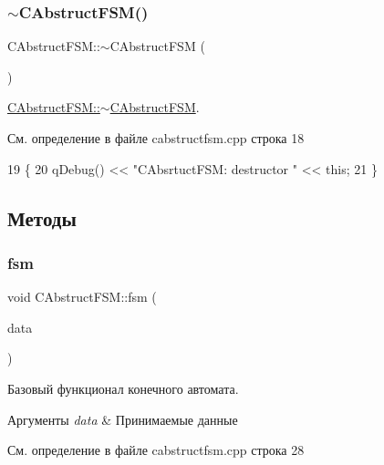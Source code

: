 \subsubsection{\texorpdfstring{$\sim$\+C\+Abstruct\+F\+S\+M()}{~CAbstructFSM()}}
{\footnotesize\ttfamily C\+Abstruct\+F\+S\+M\+::$\sim$\+C\+Abstruct\+F\+SM (\begin{DoxyParamCaption}{ }\end{DoxyParamCaption})\hspace{0.3cm}{\ttfamily [virtual]}}



\hyperlink{class_c_abstruct_f_s_m_acef4a425dee5b9705bc6bbff79225bae}{C\+Abstruct\+F\+S\+M\+::$\sim$\+C\+Abstruct\+F\+SM}. 



См. определение в файле cabstructfsm.\+cpp строка 18


\begin{DoxyCode}
19 \{
20     qDebug() << \textcolor{stringliteral}{"CAbsrtuctFSM: destructor "} << \textcolor{keyword}{this};
21 \}
\end{DoxyCode}


\subsection{Методы}
\hypertarget{class_c_abstruct_f_s_m_ae06497e1f93385cd6c20eaa84fc253c1}{}\label{class_c_abstruct_f_s_m_ae06497e1f93385cd6c20eaa84fc253c1} 
\subsubsection{\texorpdfstring{fsm}{fsm}}
{\footnotesize\ttfamily void C\+Abstruct\+F\+S\+M\+::fsm (\begin{DoxyParamCaption}\item[{Q\+String $\ast$}]{data }\end{DoxyParamCaption})\hspace{0.3cm}{\ttfamily [slot]}}



Базовый функционал конечного автомата. 


\begin{DoxyParams}{Аргументы}
{\em data} & Принимаемые данные \\
\hline
\end{DoxyParams}


См. определение в файле cabstructfsm.\+cpp строка 28



